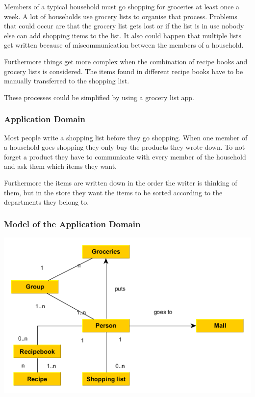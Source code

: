 \documentclass[12pt]{article}
\theoremstyle{definition}
\begin{document}
Members of a typical household must go shopping for groceries at least once a week. A lot of households use grocery lists to organise that process. Problems that could occur are that the grocery list gets lost or if the list is in use nobody else can add shopping items to the list. It also could happen that multiple lists get written because of miscommunication between the members of a household.

Furthermore things get more complex when the combination of recipe books and grocery lists is considered. The items found in different recipe books have to be manually transferred to the shopping list. 

These processes could be simplified by using a grocery list app.

\subsubsection{Application Domain}
Most people write a shopping list before they go shopping. When one member of a household goes shopping they only buy the products they wrote down. To not forget a product they have to communicate with every member of the household and ask them which items they want. 

Furthermore the items are written down in the order the writer is thinking of them, but in the store they want the items to be sorted according to the departments they belong to. 

\subsubsection{Model of the Application Domain}

\includegraphics[scale=.5]{Images/AppDomain.png}
\end{document}
